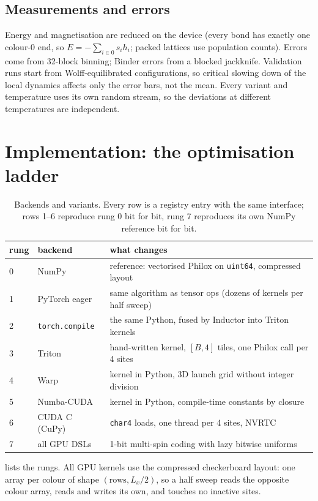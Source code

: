 \documentclass[11pt]{article}
\begin{document}
\subsection{Measurements and errors}
Energy and magnetisation are reduced on the device (every bond has exactly one colour-0 end,
so $E=-\sum_{i\in0}s_ih_i$; packed lattices use population counts). Errors come from 32-block
binning; Binder errors from a blocked jackknife. Validation runs start from Wolff-equilibrated
configurations, so critical slowing down of the local dynamics affects only the error bars,
not the mean. Every variant and temperature uses its own random stream, so the deviations at different
temperatures are independent.

\section{Implementation: the optimisation ladder}

\begin{table}[t]
\centering\small
\begin{tabular}{lll}
\toprule
rung & backend & what changes \\
\midrule
0 & NumPy & reference: vectorised Philox on \texttt{uint64}, compressed layout \\
1 & PyTorch eager & same algorithm as tensor ops (dozens of kernels per half sweep) \\
2 & \texttt{torch.compile} & the same Python, fused by Inductor into Triton kernels \\
3 & Triton & hand-written kernel, $[B,4]$ tiles, one Philox call per 4 sites \\
4 & Warp & kernel in Python, 3D launch grid without integer division \\
5 & Numba-CUDA & kernel in Python, compile-time constants by closure \\
6 & CUDA C (CuPy) & \texttt{char4} loads, one thread per 4 sites, NVRTC \\
7 & all GPU DSLs & 1-bit multi-spin coding with lazy bitwise uniforms \\
\bottomrule
\end{tabular}
\caption{Backends and variants. Every row is a registry entry with the same interface; rows 1--6
reproduce rung 0 bit for bit, rung 7 reproduces its own NumPy reference bit for bit.}
\label{tab:ladder}
\end{table}

 lists the rungs. All GPU kernels use the compressed checkerboard layout: one
array per colour of shape $(\text{rows},L_x/2)$, so a half sweep reads the opposite colour
array, reads and writes its own, and touches no inactive sites.
\end{document}
